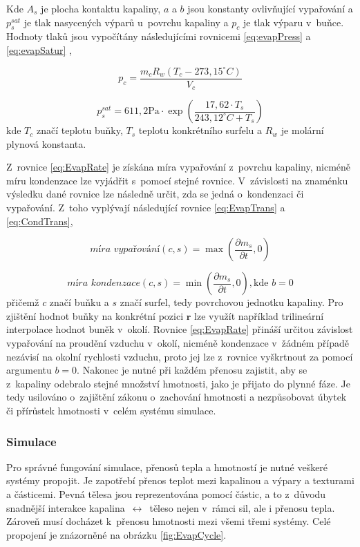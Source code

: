 Kde $A_s$ je plocha kontaktu kapaliny, $a$ a $b$ jsou konstanty ovlivňující vypařování a $p_s^{sat}$ je tlak nasycených výparů u~povrchu kapaliny a $p_c$ je tlak výparu v~buňce. Hodnoty tlaků jsou vypočítány následujícími rovnicemi \ref{eq:evapPress} a \ref{eq:evapSatur} \cite{yau1996short},

\begin{equation}
	p_c = \frac{m_c R_w(T_c - 273,15^{\circ}C)}{V_c}
	\label{eq:evapPress}
\end{equation}

\begin{equation}
	p_s^{sat} = 611,2 \text{Pa} \cdot \exp\left({\frac{17,62 \cdot T_s}{243,12^{\circ}C + T_s}}\right)
	\label{eq:evapSatur}
\end{equation}
kde $T_c$ značí teplotu buňky, $T_s$ teplotu konkrétního surfelu a $R_w$ je molární plynová konstanta.


Z~rovnice \ref{eq:EvapRate} je získána míra vypařování z~povrchu kapaliny, nicméně míru kondenzace lze vyjádřit s~pomocí stejné rovnice. V~závislosti na znaménku výsledku dané rovnice lze následně určit, zda se jedná o~kondenzaci či vypařování. Z~toho vyplývají následující rovnice \ref{eq:EvapTrans} a \ref{eq:CondTrans},

\begin{equation}
	\textit{míra vypařování}(c,s) = \max\left(\frac{\partial m_s}{\partial t}, 0\right)
	\label{eq:EvapTrans}
\end{equation}

\begin{equation}
	\textit{míra kondenzace}(c,s) = \min\left(\frac{\partial m_s}{\partial t}, 0\right), \text{kde } b = 0
	\label{eq:CondTrans}
\end{equation}
přičemž $c$ značí buňku a $s$ značí surfel, tedy povrchovou jednotku kapaliny. Pro zjištění hodnot buňky na konkrétní pozici $\mathbf{r}$ lze využít například trilineární interpolace hodnot buněk v~okolí. Rovnice \ref{eq:EvapRate} přináší určitou závislost vypařování na proudění vzduchu v~okolí, nicméně kondenzace v~žádném případě nezávisí na okolní rychlosti vzduchu, proto jej lze z~rovnice vyškrtnout za pomocí argumentu $b=0$. Nakonec je nutné při každém přenosu zajistit, aby se z~kapaliny odebralo stejné množství hmotnosti, jako je přijato do plynné fáze. Je tedy usilováno o~zajištění zákonu o~zachování hmotnosti a nezpůsobovat úbytek či přírůstek hmotnosti v~celém systému simulace.

\subsubsection{Simulace}
Pro správné fungování simulace, přenosů tepla a hmotností je nutné veškeré systémy propojit. Je zapotřebí přenos teplot mezi kapalinou a výpary a texturami a částicemi. Pevná tělesa jsou reprezentována pomocí částic, a to z~důvodu snadnější interakce kapalina~$\leftrightarrow$~\mbox{těleso} nejen v~rámci sil, ale i přenosu tepla. Zároveň musí docházet k~přenosu hmotnosti mezi všemi třemi systémy. Celé propojení je znázorněné na obrázku \ref{fig:EvapCycle}.

